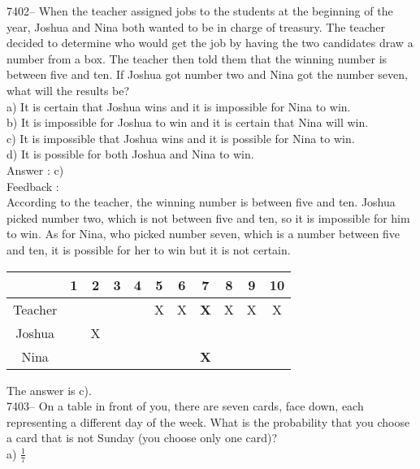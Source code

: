 \documentclass[letterpaper, 12pt]{article}
\begin{document}
7402-- When the teacher assigned jobs to the students at the beginning of the year, Joshua and Nina both wanted to be in charge of treasury. The teacher decided to determine who would get the job by having the two candidates draw a number from a box. The teacher then told them that the winning number is between five and ten. If Joshua got number two and Nina got the number seven, what will the results be?\\

a) It is certain that Joshua wins and it is impossible for Nina to win.\\
b) It is impossible for Joshua to win and it is certain that Nina will win.\\
c) It is impossible that Joshua wins and it is possible for Nina to win.\\
d) It is possible for both Joshua and Nina to win.\\

Answer : c)\\

Feedback :\\
According to the teacher, the winning number is between five and ten. Joshua picked number two, which is not between five and ten, so it is impossible for him to win. As for Nina, who picked number seven, which is a number between five and ten, it is possible for her to win but it is not certain.\\
\begin{center}
\begin{tabular}{c|cccccccccc}
& 1 & 2 & 3 & 4 & 5 & 6 & \textbf{7 }& 8 & 9 & 10\\
\hline
Teacher&  &  &  &  & X & X & \textbf{X} & X & X & X\\
Joshua&  & X &  &  &  &  &  &  &  & \\
Nina &  &  &  &  &  &  & \textbf{X} &  &  & \\
\end{tabular}
\end{center}

The answer is c).\\

7403-- On a table in front of you, there are seven cards, face down, each representing a different day of the week. What is the probability that you choose a card that is not Sunday (you choose only one card)?\\

a) $\frac{1}{7}$\\
\end{document}
